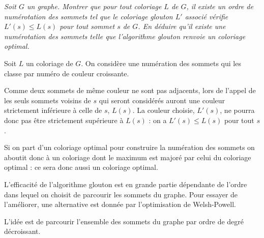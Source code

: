 \begin{Exercise} \label{q:ordreoptimal}\it 
Soit $G$ un graphe. Montrer que pour tout coloriage $L$ de $G$, il existe un ordre de numérotation des sommets tel que le coloriage glouton $L'$ associé vérifie $L'(s) \leq L(s)$ pour tout sommet $s$ de $G$. En déduire qu'il existe une numérotation des sommets telle que l'algorithme glouton renvoie un coloriage optimal. 
\end{Exercise} 
\begin{Answer}
Soit $L$ un coloriage de $G$. On considère une numération des sommets qui les classe par numéro de couleur croissante.

Comme deux sommets de même couleur ne sont pas adjacents, lors de l'appel de  les seuls sommets voisins de $s$ qui seront considérés auront une couleur strictement inférieure à celle de $s$, $L(s)$. La couleur choisie, $L'(s)$, ne pourra donc pas être strictement supérieure à $L(s)$ : on a $L'(s) \le L(s)$ pour tout $s$.

Si on part d'un coloriage optimal pour construire la numération des sommets on aboutit donc à un coloriage dont le maximum est majoré par celui du coloriage optimal : ce sera donc aussi un coloriage optimal.
\newpage
\end{Answer}

\newpage

L'efficacité de l'algorithme glouton est en grande partie dépendante de l'ordre dans lequel on choisit de parcourir les sommets du graphe. Pour essayer de l'améliorer, une alternative est donnée par l'optimisation de Welsh-Powell. 

L'idée est de parcourir l'ensemble des sommets du graphe par ordre de degré décroissant. 

